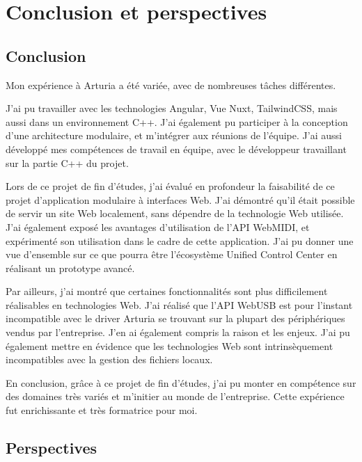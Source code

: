 \documentclass[francais]{rapportPFE}  %
\begin{document}
\section{Conclusion et perspectives}
\subsection{Conclusion}

Mon expérience à Arturia a été variée, avec de nombreuses tâches différentes.

J'ai pu travailler avec les technologies Angular, Vue Nuxt, TailwindCSS, mais aussi dans un environnement C++. J'ai également pu participer à la conception d'une architecture modulaire, et m'intégrer aux réunions de l'équipe. J'ai aussi développé mes compétences de travail en équipe, avec le développeur travaillant sur la partie C++ du projet.

Lors de ce projet de fin d'études, j'ai évalué en profondeur la faisabilité de ce projet d'application modulaire à interfaces Web. J'ai démontré qu'il était possible de servir un site Web localement, sans dépendre de la technologie Web utilisée. J'ai également exposé les avantages d'utilisation de l'API WebMIDI, et expérimenté son utilisation dans le cadre de cette application. J'ai pu donner une vue d'ensemble sur ce que pourra être l'écosystème Unified Control Center en réalisant un prototype avancé. 

Par ailleurs, j'ai montré que certaines fonctionnalités sont plus difficilement réalisables en technologies Web. J'ai réalisé que l'API WebUSB est pour l'instant incompatible avec le driver Arturia se trouvant sur la plupart des périphériques vendus par l'entreprise. J'en ai également compris la raison et les enjeux. J'ai pu également mettre en évidence que les technologies Web sont intrinsèquement incompatibles avec la gestion des fichiers locaux.

En conclusion, grâce à ce projet de fin d'études, j'ai pu monter en compétence sur des domaines très variés et m'initier au monde de l'entreprise. Cette expérience fut enrichissante et très formatrice pour moi.

\subsection{Perspectives}
\end{document}
